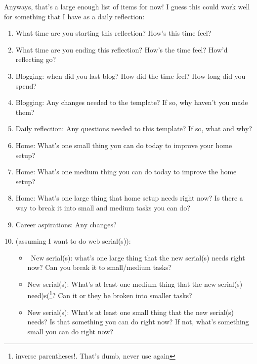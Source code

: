 \documentclass[12pt]{article}
\renewcommand{\,}{\textsuperscript{,}}
\begin{document}
Anyways, that's a large enough list of items for now! I guess this could work well for something that I have as a daily reflection:

\begin{enumerate}

\item What time are you starting this reflection? How's this time feel?

\item What time are you ending this reflection? How's the time feel? How'd reflecting go?

\item Blogging: when did you last blog? How did the time feel? How long did you spend?

\item Blogging: Any changes needed to the template? If so, why haven't you made them?

\item Daily reflection: Any questions needed to this template? If so, what and why?

\item Home: What's one small thing you can do today to improve your home setup?

\item Home: What's one medium thing you can do today to improve the home setup?

\item Home: What's one large thing that home setup needs right now? Is there a way to break it into small and medium tasks you can do?

\item Career aspirations: Any changes?

\item (assuming I want to do web serial(s)):

\begin{itemize}

\item New serial(s): what's one large thing that the new serial(s) needs right now? Can you break it to small/medium tasks?

\item New serial(s): What's at least one medium thing that the new serial(s) need)s(\footnote{inverse parentheses!. That's dumb, never use again}? Can it or they be broken into smaller tasks?

\item New serial(s): What's at least one small thing that the new serial(s) needs? Is that something you can do right now? If not, what's something small you can do right now?


\end{itemize}
\end{enumerate}
\end{document}

